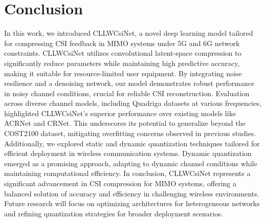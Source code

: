 \documentclass[lettersize,journal]{IEEEtran}
\begin{document}
\section{Conclusion}
In this work, we introduced CLLWCsiNet, a novel deep learning model tailored for compressing CSI feedback in MIMO systems under 5G and 6G network constraints. CLLWCsiNet utilizes convolutional latent-space compression to significantly reduce parameters while maintaining high predictive accuracy, making it suitable for resource-limited user equipment. By integrating noise resilience and a denoising network, our model demonstrates robust performance in noisy channel conditions, crucial for reliable CSI reconstruction.
Evaluation across diverse channel models, including Quadriga datasets at various frequencies, highlighted CLLWCsiNet's superior performance over existing models like ACRNet and CRNet. This underscores its potential to generalize beyond the COST2100 dataset, mitigating overfitting concerns observed in previous studies. Additionally, we explored static and dynamic quantization techniques tailored for efficient deployment in wireless communication systems. Dynamic quantization emerged as a promising approach, adapting to dynamic channel conditions while maintaining computational efficiency. In conclusion, CLLWCsiNet represents a significant advancement in CSI compression for MIMO systems, offering a balanced solution of accuracy and efficiency in challenging wireless environments. Future research will focus on optimizing architectures for heterogeneous networks and refining quantization strategies for broader deployment scenarios.
\end{document}
